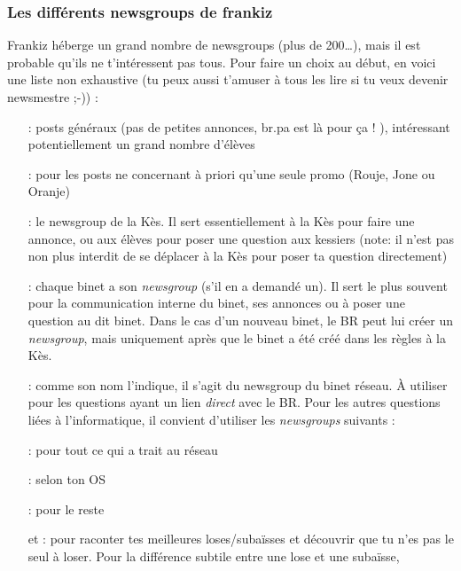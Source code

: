 \subsubsection{Les différents newsgroups de frankiz}
Frankiz héberge un grand nombre de newsgroups (plus de 200\dots ), mais il est probable qu'ils ne t'intéressent pas tous. Pour faire un choix au
début, en voici une liste non exhaustive (tu peux aussi t'amuser à tous les lire si tu veux devenir newsmestre ;-)) :
\begin{itemize}
 \item[\ngname{br.eleves} :] posts généraux (pas de petites annonces, br.pa est là pour ça ! ), intéressant potentiellement un grand nombre d'élèves
 \item[\ngname{br.promo.*} :] pour les posts ne concernant à priori qu'une seule promo (Rouje, Jone ou Oranje)
 \item[\ngname{br.kes} :] le newsgroup de la Kès. Il sert essentiellement à la Kès pour faire une annonce, ou aux élèves
                 pour poser une question aux kessiers (note: il n'est pas non plus interdit
                 de se déplacer à la Kès pour poser ta question directement)
 \item[\ngname{br.binet.ton\_binet} :] chaque binet a son \emph{newsgroup} (s'il en a demandé un). Il sert le plus souvent pour la communication interne
                              du binet, ses annonces ou à poser une question au dit binet.
                              Dans le cas d'un nouveau binet, le BR peut lui créer un \emph{newsgroup}, mais uniquement
                              après que le binet a été créé dans les règles à la Kès.
 \item[\ngname{br.binet.br} :] comme son nom l'indique, il s'agit du newsgroup du binet réseau.
                      À utiliser pour les questions ayant un lien \emph{direct} avec le BR.
                      Pour les autres questions liées à l'informatique,
                      il convient d'utiliser les \emph{newsgroups} suivants :
 \item[\ngname{br.informatique.reseau} :] pour tout ce qui a trait au réseau
 \item[\ngname{br.informatique.windows/linux/mac} :] selon ton OS
 \item[\ngname{br.informatique.divers} :] pour le reste
 \item[\ngname{br.binet.lose} et \ngname{br.binet.subaïsse} :] pour raconter tes meilleures loses/subaïsses et découvrir
       que tu n'es pas le seul à loser. Pour la différence subtile entre une lose et une subaïsse,

\end{itemize}

